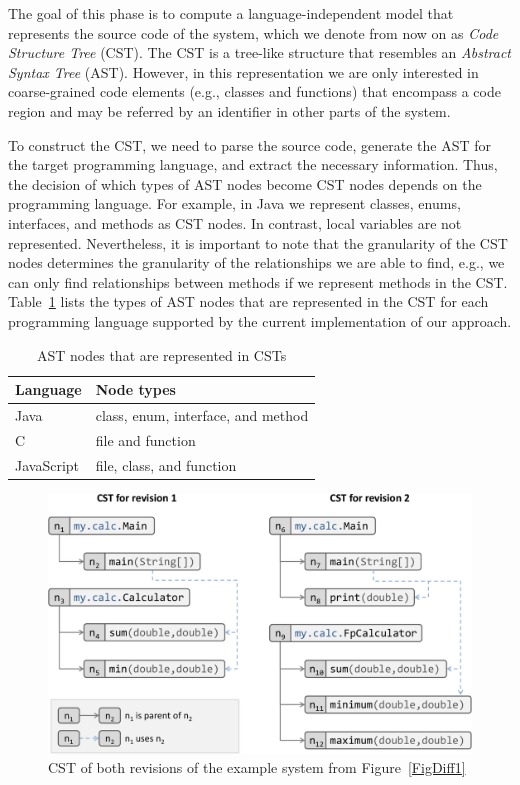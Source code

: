 The goal of this phase is to compute a language-independent model that represents the source code of the system, which we denote from now on as \emph{Code Structure Tree} (CST). The CST is a tree-like structure that resembles an \emph{Abstract Syntax Tree} (AST). However, in this representation we are only interested in coarse-grained code elements (e.g., classes and functions) that encompass a code region and may be referred by an identifier in other parts of the system.

To construct the CST, we need to parse the source code, generate the AST for the target programming language, and extract the necessary information.
Thus, the decision of which types of AST nodes become CST nodes depends on the programming language.
For example, in Java we represent classes, enums, interfaces, and methods as CST nodes.
In contrast, local variables are not represented.
Nevertheless, it is important to note that the granularity of the CST nodes determines the granularity of the relationships we are able to find, e.g., we can only find relationships between methods if we represent methods in the CST.
Table~\ref{TabCstNodes} lists the types of AST nodes that are represented in the CST for each programming language supported by the current implementation of our approach.

\begin{table}[htbp]
\renewcommand{\arraystretch}{1.2}
\caption{AST nodes that are represented in CSTs}
\label{TabCstNodes}
\centering
\begin{tabular}{@{}ll@{}}
\toprule
Language & Node types \\
\midrule
Java & class, enum, interface, and method \\
C & file and function \\
JavaScript & file, class, and function \\
\bottomrule
\end{tabular}
\end{table}

\begin{figure}[htb]
\centering
\includegraphics[width=1.0\linewidth]{img/cstDiff1.pdf}
\caption{CST of both revisions of the example system from Figure~\ref{FigDiff1}}
\label{FigJavaToCst}
\end{figure}

